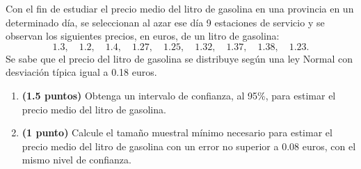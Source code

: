 
Con el fin de estudiar el precio medio del litro de gasolina en una provincia en un determinado día, se seleccionan al azar ese día 9 estaciones de servicio y se observan los siguientes precios, en euros, de un litro de gasolina:
\[
1.3,\quad1.2,\quad1.4,\quad1.27,\quad1.25,\quad1.32,\quad1.37,\quad1.38,\quad1.23.
\]
Se sabe que el precio del litro de gasolina se distribuye según una ley Normal con desviación típica igual a 0.18 euros.
\begin{enumerate}[label=\alph*)]
\item \textbf{(1.5 puntos)} Obtenga un intervalo de confianza, al 95\%, para estimar el precio medio del litro de gasolina.
\item \textbf{(1 punto)} Calcule el tamaño muestral mínimo necesario para estimar el precio medio del litro de gasolina con un error no superior a 0.08 euros, con el mismo nivel de confianza.
\end{enumerate}
